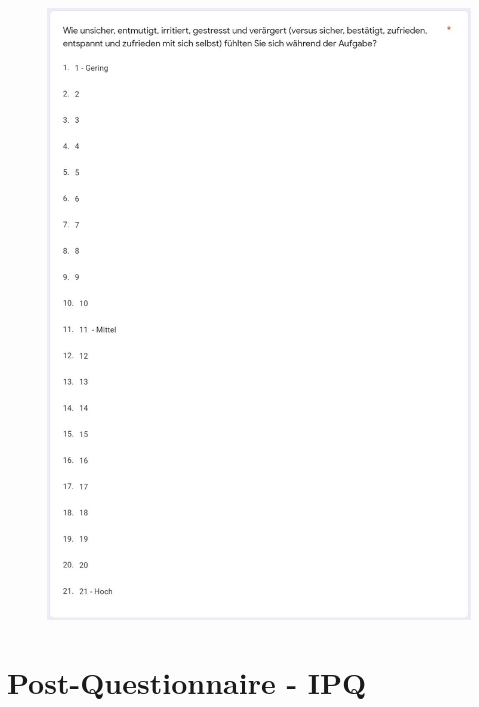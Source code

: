 \documentclass[a4paper,11pt]{article}%
\renewcommand{\\}{\vspace*{0.5\baselineskip} \newline}
\begin{document}
	\begin{figure}[H]
		\begin{footnotesize}
			\includegraphics[width=\textwidth]{Abbildungen/Fragebogen/Post-Questionnaire/PQTLX6}
		\end{footnotesize}
	\end{figure}	

\newpage
\section{Post-Questionnaire - IPQ}
\label{Post-Questionnaire - IPQ}
\end{document}

